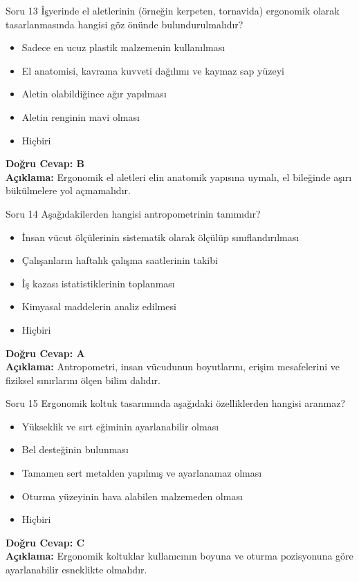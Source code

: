 \documentclass[12pt,a4paper]{article}
\begin{document}
\begin{testcard}{Soru 13}
    İşyerinde el aletlerinin (örneğin kerpeten, tornavida) ergonomik olarak tasarlanmasında hangisi göz önünde bulundurulmalıdır?
    \begin{itemize}
        \item[A)] Sadece en ucuz plastik malzemenin kullanılması
        \item[B)] El anatomisi, kavrama kuvveti dağılımı ve kaymaz sap yüzeyi
        \item[C)] Aletin olabildiğince ağır yapılması
        \item[D)] Aletin renginin mavi olması
        \item[E)] Hiçbiri
    \end{itemize}
    \tcblower
    \textbf{Doğru Cevap: B} \\
    \textbf{Açıklama:} Ergonomik el aletleri elin anatomik yapısına uymalı, el bileğinde aşırı bükülmelere yol açmamalıdır.
\end{testcard}

\begin{testcard}{Soru 14}
    Aşağıdakilerden hangisi antropometrinin tanımıdır?
    \begin{itemize}
        \item[A)] İnsan vücut ölçülerinin sistematik olarak ölçülüp sınıflandırılması
        \item[B)] Çalışanların haftalık çalışma saatlerinin takibi
        \item[C)] İş kazası istatistiklerinin toplanması
        \item[D)] Kimyasal maddelerin analiz edilmesi
        \item[E)] Hiçbiri
    \end{itemize}
    \tcblower
    \textbf{Doğru Cevap: A} \\
    \textbf{Açıklama:} Antropometri, insan vücudunun boyutlarını, erişim mesafelerini ve fiziksel sınırlarını ölçen bilim dalıdır.
\end{testcard}

\begin{testcard}{Soru 15}
    Ergonomik koltuk tasarımında aşağıdaki özelliklerden hangisi aranmaz?
    \begin{itemize}
        \item[A)] Yükseklik ve sırt eğiminin ayarlanabilir olması
        \item[B)] Bel desteğinin bulunması
        \item[C)] Tamamen sert metalden yapılmış ve ayarlanamaz olması
        \item[D)] Oturma yüzeyinin hava alabilen malzemeden olması
        \item[E)] Hiçbiri
    \end{itemize}
    \tcblower
    \textbf{Doğru Cevap: C} \\
    \textbf{Açıklama:} Ergonomik koltuklar kullanıcının boyuna ve oturma pozisyonuna göre ayarlanabilir esneklikte olmalıdır.
\end{testcard}
\end{document}
